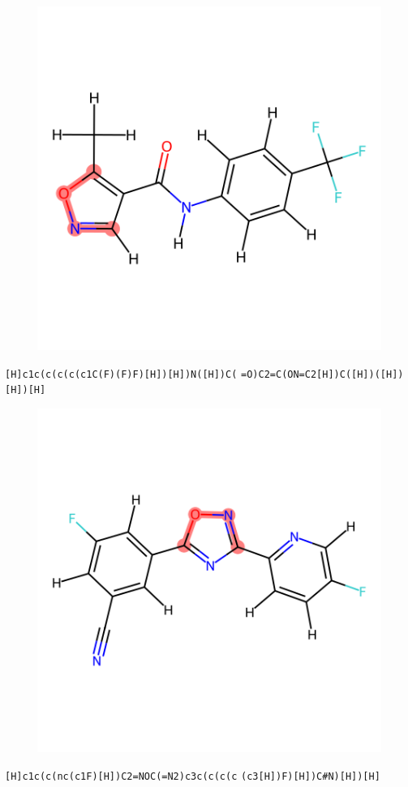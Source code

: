 \documentclass{article}
\begin{document}
\begin{figure}[ht]
\centering
    \includegraphics{mol220.png}
\end{figure}
\verb|[H]c1c(c(c(c(c1C(F)(F)F)[H])[H])N([H])C(| \verb|=O)C2=C(ON=C2[H])C([H])([H])[H])[H]|

\clearpage

\begin{figure}[ht]
\centering
    \includegraphics{mol221.png}
\end{figure}
\verb|[H]c1c(c(nc(c1F)[H])C2=NOC(=N2)c3c(c(c(c| \verb|(c3[H])F)[H])C#N)[H])[H]|
\end{document}
